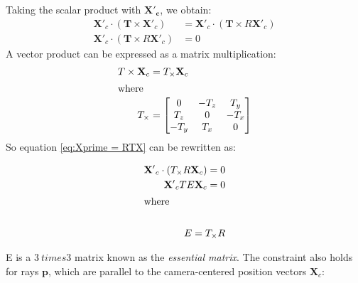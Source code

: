 Taking the scalar product with $\mathbf{X'_c}$, we obtain:
\begin{align}
    \mathbf{X'}_c \cdot (\mathbf{T} \times \mathbf{X'}_c) &= \mathbf{X'}_c\cdot (\mathbf{T} \times R\mathbf{X'}_c)\nonumber \\
    \mathbf{X'}_c \cdot (\mathbf{T} \times R\mathbf{X'}_c) &= 0 \nonumber
\end{align}
A vector product can be expressed as a matrix multiplication:
\begin{align}
T \times \mathbf{X}_c &= T_\times \mathbf{X}_c \\
\intertext{where}
T_\times &=\begin{bmatrix}
0    & -T_z  & T_y\\
T_z  & 0     & -T_x\\
-T_y  & T_x   & 0
\end{bmatrix}
\end{align}
So equation \eqref{eq:Xprime = RTX} can be rewritten as:

\begin{align}
\mathbf{X'}_c \cdot (T_\times R\mathbf{X}_c) = 0 \nonumber\\
\mathbf{X'}_c T E \mathbf{X}_c = 0  \nonumber\\
\intertext{where}  \nonumber\\
E = T_\times R \nonumber
\end{align}

E is a $3 \ times 3$ matrix known as the \emph{essential matrix}.
The constraint also holds for rays $\mathbf{p}$, which are parallel to the camera-centered position vectors $\mathbf{X}_c$:


